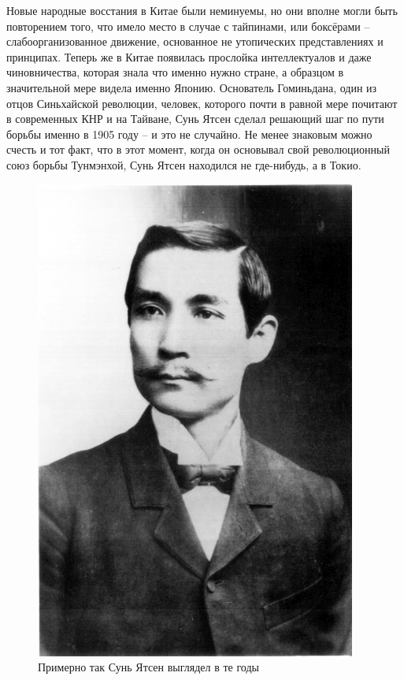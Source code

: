 Новые народные восстания в Китае были неминуемы, но они вполне могли быть повторением того, что имело место в случае с тайпинами, или боксёрами – слабоорганизованное движение, основанное не утопических представлениях и принципах. Теперь же в Китае появилась прослойка интеллектуалов и даже чиновничества, которая знала что именно нужно стране, а образцом в значительной мере видела именно Японию. Основатель Гоминьдана, один из отцов Синьхайской революции, человек, которого почти в равной мере почитают в современных КНР и на Тайване, Сунь Ятсен сделал решающий шаг по пути борьбы именно в 1905 году – и это не случайно. Не менее знаковым можно счесть и тот факт, что в этот момент, когда он основывал свой революционный союз борьбы Тунмэнхой, Сунь Ятсен находился не где-нибудь, а в Токио. 

\begin{figure}[h!tb] 
	\centering\includegraphics[scale=0.5]{Glava2/UtLNSsPuDcE.jpg}
	\caption{Примерно так Сунь Ятсен выглядел в те годы}%
\end{figure}

